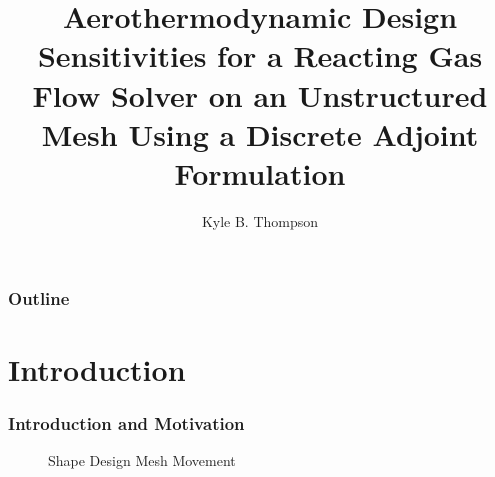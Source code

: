 \documentclass{beamer}
\title{Aerothermodynamic Design Sensitivities for a Reacting Gas Flow Solver
  on an Unstructured Mesh Using a Discrete Adjoint Formulation}
\author{ Kyle B. Thompson }
\begin{document}
\begin{frame}
  \titlepage
\end{frame}
\begin{frame}
  \frametitle{Outline}
  \tableofcontents
\end{frame}
\section{Introduction}
\begin{frame}
  \frametitle{Introduction and Motivation}
  \vspace{-.5cm}
  \begin{figure}[ht]
     \begin{minipage}[b]{0.45\linewidth}
         \centering
         \begin{cboxt}[white]
         \end{cboxt}
         \caption{Shape Design Mesh Movement}
     \end{minipage}
     \hspace{0.5cm}
     \begin{minipage}[b]{0.45\linewidth}
         \centering
         \begin{cboxt}[white]

\end{cboxt}
\end{minipage}
\end{figure}
\end{frame}
\end{document}
